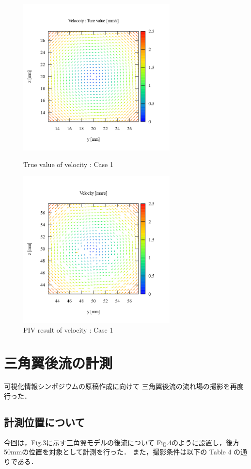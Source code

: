 \documentclass[twocolumn,a4j]{jsarticle}
\begin{document}
\begin{figure}[htbp]
  \footnotesize
  \begin{center}
    \includegraphics[width=80mm]{../images/vector_true_value.png}
    \caption{True value of velocity : Case 1}
    \includegraphics[width=80mm]{../images/vector_simulation.png}
    \caption{PIV result of velocity : Case 1}
  \end{center}
\end{figure}

\section{三角翼後流の計測}
可視化情報シンポジウムの原稿作成に向けて
三角翼後流の流れ場の撮影を再度行った．\\

\subsection{計測位置について}
今回は，Fig.3に示す三角翼モデルの後流について
Fig.4のように設置し，後方50mmの位置を対象として計測を行った．
また，撮影条件は以下の Table 4 の通りである．
\end{document}
